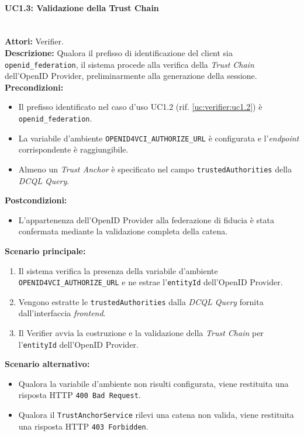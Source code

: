 \paragraph{\large\bfseries UC1.3: Validazione della Trust Chain}
\label{uc:verifier:uc1.3}
\mbox{}\\
\noindent\textbf{Attori:} Verifier.
\\
\noindent\textbf{Descrizione:} Qualora il prefisso di identificazione del client sia \texttt{openid\_\allowbreak{}federation}, il sistema procede alla verifica della \textit{Trust Chain} dell'OpenID Provider, preliminarmente alla generazione della sessione.
\\
\noindent\textbf{Precondizioni:}
\begin{itemize}
    \item Il prefisso identificato nel caso d'uso UC1.2 (rif. \ref{uc:verifier:uc1.2}) è \texttt{openid\_\allowbreak{}federation}.
    \item La variabile d'ambiente \texttt{OPENID4VCI\_\allowbreak{}AUTHORIZE\_\allowbreak{}URL} è configurata e l'\textit{endpoint} corrispondente è raggiungibile.
    \item Almeno un \textit{Trust Anchor} è specificato nel campo \texttt{trustedAuthorities} della \textit{DCQL Query}.
\end{itemize}
\noindent\textbf{Postcondizioni:}
\begin{itemize}
    \item L'appartenenza dell'OpenID Provider alla federazione di fiducia è stata confermata mediante la validazione completa della catena.
\end{itemize}
\noindent\textbf{Scenario principale:}
\begin{enumerate}
    \item Il sistema verifica la presenza della variabile d'ambiente \texttt{OPENID4VCI\_\allowbreak{}AUTHORIZE\_\allowbreak{}URL} e ne estrae l'\texttt{entityId} dell'OpenID Provider.
    \item Vengono estratte le \texttt{trustedAuthorities} dalla \textit{DCQL Query} fornita dall'interfaccia \textit{frontend}.
    \item Il Verifier avvia la costruzione e la validazione della \textit{Trust Chain} per l'\texttt{entityId} dell'OpenID Provider.
\end{enumerate}

\noindent\textbf{Scenario alternativo:}
\begin{itemize}
    \item Qualora la variabile d'ambiente non risulti configurata, viene restituita una risposta HTTP \texttt{400 Bad Request}.
    \item Qualora il \texttt{TrustAnchorService} rilevi una catena non valida, viene restituita una risposta HTTP \texttt{403 Forbidden}.
\end{itemize}


